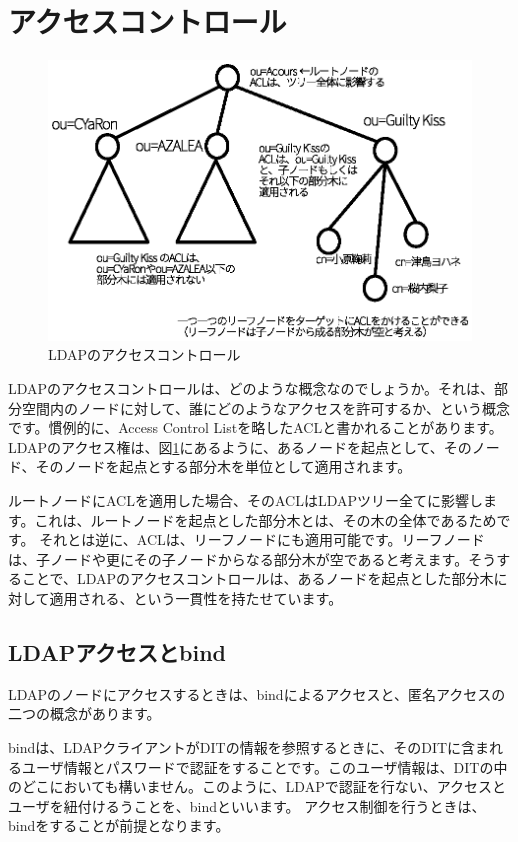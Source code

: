 \section{アクセスコントロール}

\begin{figure}[htbp]
	\includegraphics[width=12cm,clip]{draw/acl.eps}
	\caption{LDAPのアクセスコントロール}
	\label{fig:acl}
\end{figure}

LDAPのアクセスコントロールは、どのような概念なのでしょうか。それは、部分空間内のノードに対して、誰にどのようなアクセスを許可するか、という概念です。慣例的に、Access Control Listを略したACLと書かれることがあります。
LDAPのアクセス権は、図\ref{fig:acl}にあるように、あるノードを起点として、そのノード、そのノードを起点とする部分木を単位として適用されます。

ルートノードにACLを適用した場合、そのACLはLDAPツリー全てに影響します。これは、ルートノードを起点とした部分木とは、その木の全体であるためです。
それとは逆に、ACLは、リーフノードにも適用可能です。リーフノードは、子ノードや更にその子ノードからなる部分木が空であると考えます。そうすることで、LDAPのアクセスコントロールは、あるノードを起点とした部分木に対して適用される、という一貫性を持たせています。



\subsection{LDAPアクセスとbind}

LDAPのノードにアクセスするときは、bindによるアクセスと、匿名アクセスの二つの概念があります。

bindは、LDAPクライアントがDITの情報を参照するときに、そのDITに含まれるユーザ情報とパスワードで認証をすることです。このユーザ情報は、DITの中のどこにおいても構いません。このように、LDAPで認証を行ない、アクセスとユーザを紐付けるうことを、bindといいます。
アクセス制御を行うときは、bindをすることが前提となります。

